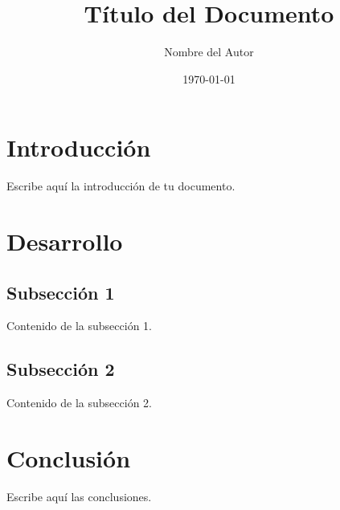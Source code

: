 \documentclass[12pt, a4paper]{article}
\title{Título del Documento}
\author{Nombre del Autor}
\date{\today}
\begin{document}
\maketitle
\tableofcontents
\newpage


\section{Introducción}

Escribe aquí la introducción de tu documento.

\section{Desarrollo}

\subsection{Subsección 1}

Contenido de la subsección 1.

\subsection{Subsección 2}

Contenido de la subsección 2.

\section{Conclusión}

Escribe aquí las conclusiones.


\end{document}
